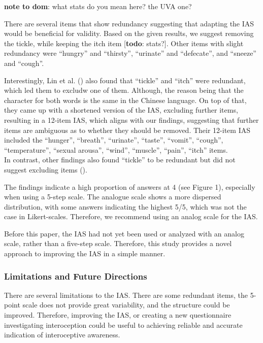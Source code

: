 \documentclass[
  man,
  floatsintext,
  longtable,
  nolmodern,
  notxfonts,
  notimes,
  colorlinks=true,linkcolor=blue,citecolor=blue,urlcolor=blue]{apa7}
\begin{document}
\textbf{note to dom}: what stats do you mean here? the UVA one?

There are several items that show redundancy suggesting that adapting
the IAS would be beneficial for validity. Based on the given results, we
suggest removing the tickle, while keeping the itch item
{[}\textbf{todo}: stats?{]}. Other items with slight redundancy were
``hungry'' and ``thirsty'', ``urinate'' and ``defecate'', and ``sneeze''
and ``cough''.

Interestingly, Lin et al. () also found that
``tickle'' and ``itch'' were redundant, which led them to excludw one of
them. Although, the reason being that the character for both words is
the same in the Chinese language. On top of that, they came up with a
shortened version of the IAS, excluding further items, resulting in a
12-item IAS, which aligns with our findings, suggesting that further
items are ambiguous as to whether they should be removed. Their 12-item
IAS included the ``hunger'', ``breath'', ``urinate'', ``taste'',
``vomit'', ``cough'', ``temperature'', ``sexual arousa'', ``wind'',
``muscle'', ``pain'', ``itch'' items.\\
In contrast, other findings also found ``tickle'' to be redundant but
did not suggest excluding items ().

The findings indicate a high proportion of answers at 4 (see Figure 1),
especially when using a 5-step scale. The analogue scale shows a more
dispersed distribution, with some answers indicating the highest 5/5,
which was not the case in Likert-scales. Therefore, we recommend using
an analog scale for the IAS.

Before this paper, the IAS had not yet been used or analyzed with an
analog scale, rather than a five-step scale. Therefore, this study
provides a novel approach to improving the IAS in a simple manner.

\subsubsection{Limitations and Future
Directions}\label{limitations-and-future-directions}

There are several limitations to the IAS. There are some redundant
items, the 5-point scale does not provide great variability, and the
structure could be improved. Therefore, improving the IAS, or creating a
new questionnaire investigating interoception could be useful to
achieving reliable and accurate indication of interoceptive awareness.
\end{document}
